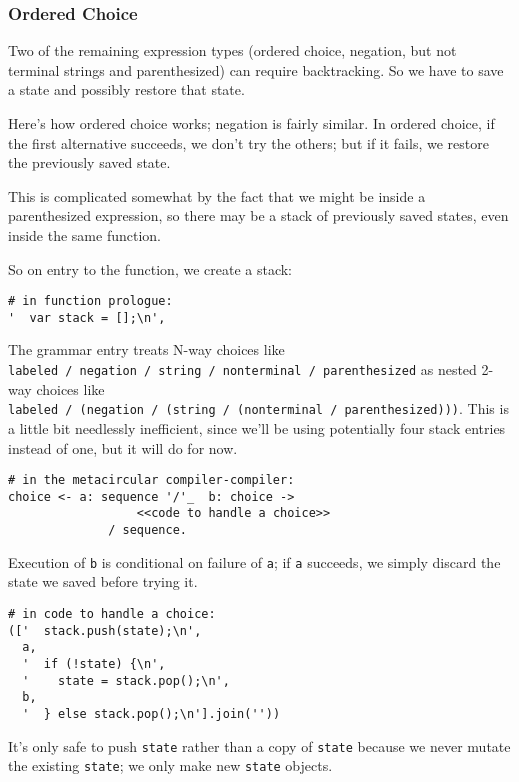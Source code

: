 \documentclass[
]{article}
\begin{document}
\hypertarget{ordered-choice}{%
\subsubsection{Ordered Choice}\label{ordered-choice}}

Two of the remaining expression types (ordered choice, negation, but not
terminal strings and parenthesized) can require backtracking. So we have
to save a state and possibly restore that state.

Here's how ordered choice works; negation is fairly similar. In ordered
choice, if the first alternative succeeds, we don't try the others; but
if it fails, we restore the previously saved state.

This is complicated somewhat by the fact that we might be inside a
parenthesized expression, so there may be a stack of previously saved
states, even inside the same function.

So on entry to the function, we create a stack:

\begin{verbatim}
# in function prologue:
'  var stack = [];\n',
\end{verbatim}

The grammar entry treats N-way choices like
\texttt{labeled\ /\ negation\ /\ string\ /\ nonterminal\ /\ parenthesized}
as nested 2-way choices like
\texttt{labeled\ /\ (negation\ /\ (string\ /\ (nonterminal\ /\ parenthesized)))}.
This is a little bit needlessly inefficient, since we'll be using
potentially four stack entries instead of one, but it will do for now.

\begin{verbatim}
# in the metacircular compiler-compiler:
choice <- a: sequence '/'_  b: choice ->
                  <<code to handle a choice>>
              / sequence.
\end{verbatim}

Execution of \texttt{b} is conditional on failure of \texttt{a}; if
\texttt{a} succeeds, we simply discard the state we saved before trying
it.

\begin{verbatim}
# in code to handle a choice:
(['  stack.push(state);\n',
  a,
  '  if (!state) {\n',
  '    state = stack.pop();\n',
  b,
  '  } else stack.pop();\n'].join(''))
\end{verbatim}

It's only safe to push \texttt{state} rather than a copy of
\texttt{state} because we never mutate the existing \texttt{state}; we
only make new \texttt{state} objects.
\end{document}
